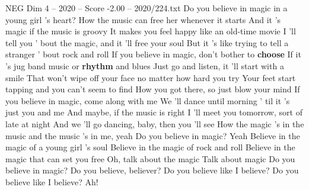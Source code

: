 \begin{textsample}{NEG Dim 4 – 2020 – Score -2.00 – 2020/224.txt}  \label{ex:f4_neg_021}
Do you believe in magic in a young girl 's heart?
How the music can free her whenever it starts And it 's magic if the music is groovy It makes you feel happy like an old-time movie I 'll tell you ' bout the magic, and it 'll free your soul But it 's like trying to tell a stranger ' bout rock and roll If you believe in magic, don't bother to \textbf{choose} If it 's jug band music or \textbf{rhythm} and blues Just go and listen, it 'll start with a smile That won't wipe off your face no matter how hard you try Your feet start tapping and you can't seem to find How you got there, so just blow your mind If you believe in magic, come along with me We 'll dance until morning ' til it 's just you and me And maybe, if the music is right I 'll meet you tomorrow, sort of late at night And we 'll go dancing, baby, then you 'll see How the magic 's in the music and the music 's in me, yeah Do you believe in magic?
Yeah Believe in the magic of a young girl 's soul Believe in the magic of rock and roll Believe in the magic that can set you free Oh, talk about the magic Talk about magic Do you believe in magic?
Do you believe, believer?
Do you believe like I believe?
Do you believe like I believe?
Ah!

\end{textsample}
